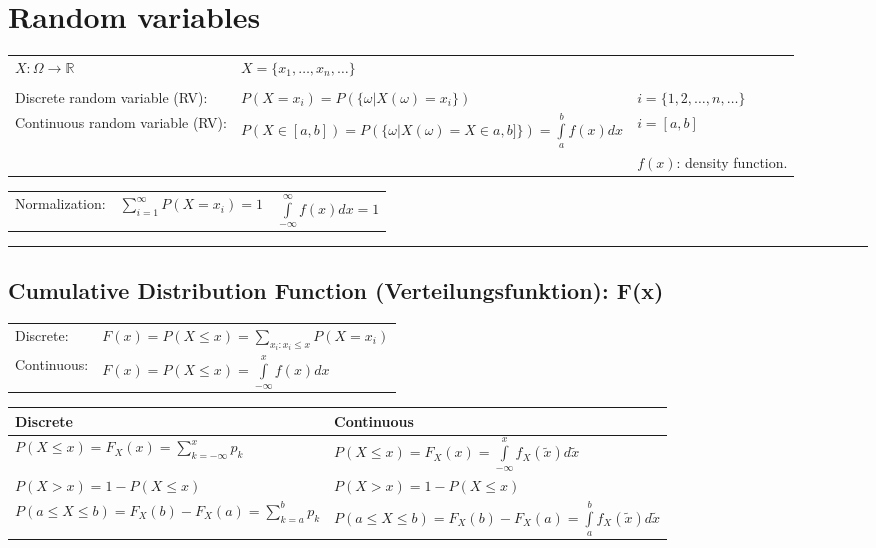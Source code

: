 
\section{Random variables }

\begin{tabular}{p{5.5cm}p{8.5cm}p{4cm}}
$X: \Omega \rightarrow \mathbb{R}$&	$X=\{x_1, \ldots, x_n, \ldots\}$&\\
&&\\
	Discrete random variable (RV): &$P(X=x_i)=P(\{\omega|X(\omega)=x_i\})$& $i=\{1,2,\ldots,n,\ldots\}$\\
	Continuous random variable (RV): &$P(X\in [a,b])=P(\{\omega|X(\omega)=X\in a,b]\})=\int\limits_a^b{f(x)}dx$& $i=[a,b]$ \\
									&																			&$f(x)$: density function.
\end{tabular}

\begin{tabular}{p{5.5cm}p{4cm}p{4cm}}
Normalization:&$\sum\limits_{i=1}^\infty{P(X=x_i)}=1$& $\int\limits_{-\infty}^\infty{f(x)dx}=1$\\
\end{tabular}

\vspace{2mm}
\hrule
\vspace{3mm}

\subsection{Cumulative Distribution Function (Verteilungsfunktion): F(x) }

	\begin{tabular}{p{3cm}p{6cm}}
	
	Discrete: &$F(x)=P(X\leq x)=\sum\limits_{x_i:x_i\leq x}{P(X=x_i)}$\\
	Continuous: &$F(x)=P(X\leq x)=\int\limits_{-\infty}^x{f(x)dx}$\\
	\end{tabular}
	
	\renewcommand{\arraystretch}{1.5}
	\begin{tabular}[]{|l|l|}
	      	\hline
	      	\textbf{Discrete} & \textbf{Continuous}\\
	      	\hline
	      	\hline
	      	$P(X\leq x)=F_X(x)=\sum\limits_{k=-\infty}^x p_k$ &
	      	$P(X\leq x)=F_X(x)=\int\limits_{-\infty}^x
	      	f_X(\tilde{x})d\tilde{x}$\\
				$P(X>x)=1-P(X\leq x)$ & $P(X>x)=1-P(X\leq x)$\\        	
	      	$P(a \le X \leq b)=F_X(b)-F_X(a)=\sum\limits_{k=a}^b p_k$ &
				$P(a \le X \leq b)=F_X(b)-F_X(a)=\int \limits_a^b
				f_X(\tilde{x})d\tilde{x}$\\
	      	\hline
	\end{tabular}
	\renewcommand{\arraystretch}{1}

